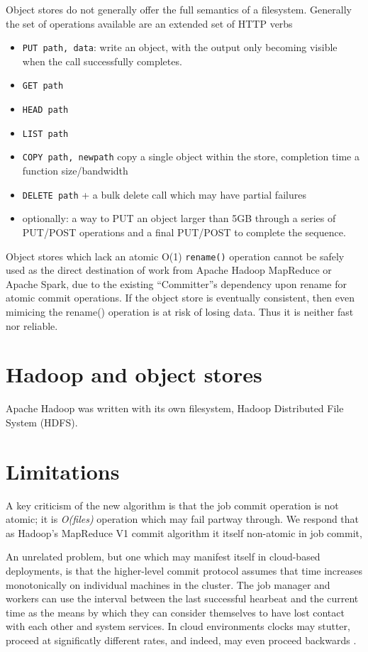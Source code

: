\documentclass[9pt,technote]{IEEEtran}
\begin{document}
Object stores do not generally offer the full semantics of a filesystem. Generally the set of operations available are an extended set of HTTP verbs
\begin{itemize}
  \item{\texttt{PUT path, data}: write an object, with the output only becoming visible when the call successfully completes.}
  \item{\texttt{GET path}}
  \item{\texttt{HEAD path}}
  \item{\texttt{LIST path}}
  \item{\texttt{COPY path, newpath} copy a single object within the store, completion time a function size/bandwidth}
  \item{\texttt{DELETE path}  + a bulk delete call which may have partial failures}
  \item{optionally: a way to PUT an object larger than 5GB through a series of PUT/POST operations and a final PUT/POST to complete the sequence.}
\end{itemize}

Object stores which lack an atomic O(1) \texttt{rename()} operation cannot be safely used as the direct destination of work from Apache Hadoop MapReduce or Apache Spark, due to the existing ``Committer''s dependency upon rename for atomic commit operations.
If the object store is eventually consistent, then even mimicing the rename() operation is at risk of losing data.
Thus it is neither fast nor reliable.


\section{Hadoop and object stores}

Apache Hadoop was written with its own filesystem, Hadoop Distributed File System (HDFS).







\section{Limitations}

A key criticism of the new algorithm is that the job commit operation is not atomic;
it is \emph{O(files)} operation which may fail partway through. We respond that as Hadoop's MapReduce V1 commit algorithm it itself non-atomic in job commit,

An unrelated problem, but one which may manifest itself in cloud-based deployments, is that the higher-level commit protocol assumes that time increases monotonically on individual machines in the cluster.
The job manager and workers can use the interval between the last successful hearbeat and the current time as the means by which they can consider themselves to have lost contact with each other and system services.
In cloud environments clocks may stutter, proceed at significatly different rates, and indeed, may even proceed backwards \cite{anything?}.
\end{document}

